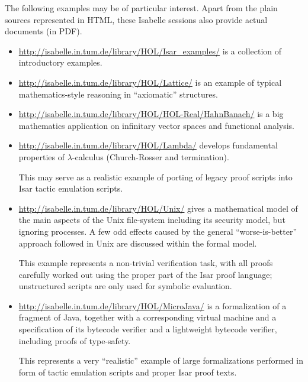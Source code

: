 The following examples may be of particular interest.  Apart from the plain
sources represented in HTML, these Isabelle sessions also provide actual
documents (in PDF).
\begin{itemize}
\item \url{http://isabelle.in.tum.de/library/HOL/Isar_examples/} is a
  collection of introductory examples.
\item \url{http://isabelle.in.tum.de/library/HOL/Lattice/} is an example of
  typical mathematics-style reasoning in ``axiomatic'' structures.
\item \url{http://isabelle.in.tum.de/library/HOL/HOL-Real/HahnBanach/} is a
  big mathematics application on infinitary vector spaces and functional
  analysis.
\item \url{http://isabelle.in.tum.de/library/HOL/Lambda/} develops fundamental
  properties of $\lambda$-calculus (Church-Rosser and termination).
  
  This may serve as a realistic example of porting of legacy proof scripts
  into Isar tactic emulation scripts.
\item \url{http://isabelle.in.tum.de/library/HOL/Unix/} gives a mathematical
  model of the main aspects of the Unix file-system including its security
  model, but ignoring processes.  A few odd effects caused by the general
  ``worse-is-better'' approach followed in Unix are discussed within the
  formal model.
  
  This example represents a non-trivial verification task, with all proofs
  carefully worked out using the proper part of the Isar proof language;
  unstructured scripts are only used for symbolic evaluation.
\item \url{http://isabelle.in.tum.de/library/HOL/MicroJava/} is a
  formalization of a fragment of Java, together with a corresponding virtual
  machine and a specification of its bytecode verifier and a lightweight
  bytecode verifier, including proofs of type-safety.
  
  This represents a very ``realistic'' example of large formalizations
  performed in form of tactic emulation scripts and proper Isar proof texts.
\end{itemize}


